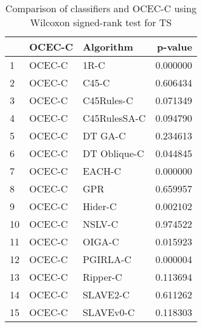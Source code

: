 \begin{table}
\footnotesize
\caption{Comparison of classifiers and OCEC-C using Wilcoxon signed-rank test for TS}
\label{tab:OCEC-C wilcoxon TS comparison}
\begin{tabular}{lllr}
\hline
 & OCEC-C & Algorithm & p-value \\
\hline
1 & OCEC-C & 1R-C & 0.000000 \\
2 & OCEC-C & C45-C & 0.606434 \\
3 & OCEC-C & C45Rules-C & 0.071349 \\
4 & OCEC-C & C45RulesSA-C & 0.094790 \\
5 & OCEC-C & DT GA-C & 0.234613 \\
6 & OCEC-C & DT Oblique-C & 0.044845 \\
7 & OCEC-C & EACH-C & 0.000000 \\
8 & OCEC-C & GPR & 0.659957 \\
9 & OCEC-C & Hider-C & 0.002102 \\
10 & OCEC-C & NSLV-C & 0.974522 \\
11 & OCEC-C & OIGA-C & 0.015923 \\
12 & OCEC-C & PGIRLA-C & 0.000004 \\
13 & OCEC-C & Ripper-C & 0.113694 \\
14 & OCEC-C & SLAVE2-C & 0.611262 \\
15 & OCEC-C & SLAVEv0-C & 0.118303 \\
\hline
\end{tabular}
\end{table}
